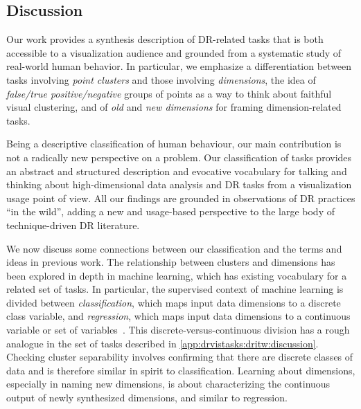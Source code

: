 
\subsection{Discussion}
\label{app:drvistasks:dritw:discussion}


Our work provides a synthesis description of \ac{DR}-related tasks that is both accessible to a visualization audience and grounded from a systematic study of real-world human behavior. 
In particular, we emphasize a differentiation between tasks involving {\it point clusters} and those involving {\it dimensions}, the idea of {\it false/true positive/negative} groups of points as a way to think about faithful visual clustering, and of {\it old} and {\it new dimensions} for framing dimension-related tasks. 

Being a descriptive classification of human behaviour, our main contribution is not a radically new perspective on a problem. 
Our classification of tasks provides an abstract and structured description and evocative vocabulary for talking and thinking about high-dimensional data analysis and \ac{DR} tasks from a visualization usage point of view. 
All our findings are grounded in observations of \ac{DR} practices ``in the wild'', adding a new and usage-based perspective to the large body of technique-driven \ac{DR} literature. 

We now discuss some connections between our classification and the terms and ideas in previous work. 
The relationship between clusters and dimensions has been explored in depth in machine learning, which has existing vocabulary for a related set of tasks.  
In particular, the supervised context of machine learning is divided between {\it classification}, which maps input data dimensions to a discrete class variable, and {\it regression}, which maps input data dimensions to a continuous variable or set of variables~\cite{Murphy2012}.  
This discrete-versus-continuous division has a rough analogue in the set of tasks described in \autoref{app:drvistasks:dritw:discussion}. 
Checking cluster separability involves confirming that there are discrete classes of data and is therefore similar in spirit to classification.  
Learning about dimensions, especially in naming new dimensions, is about characterizing the continuous output of newly synthesized dimensions, and similar to regression.  


